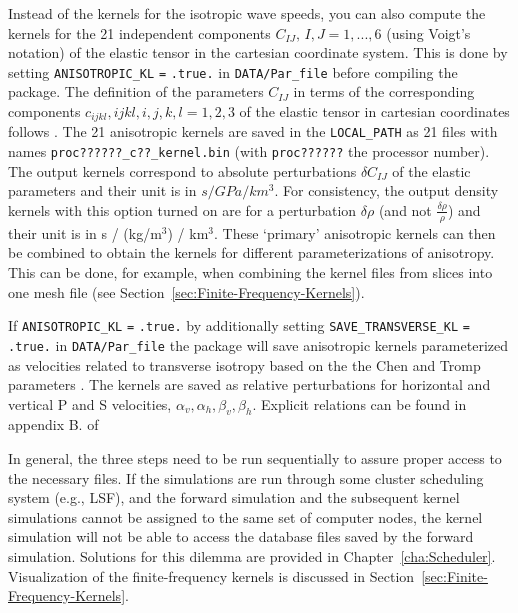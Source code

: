 \begin{enumerate}
Instead of the kernels for the isotropic wave speeds, you can also
compute the kernels for the 21 independent components $C_{IJ},\, I,J=1,...,6$
(using Voigt's notation) of the elastic tensor in the cartesian coordinate
system. This is done by setting \texttt{ANISOTROPIC\_KL} \texttt{=}
\texttt{.true.} in \texttt{DATA/Par\_file} before compiling the package.
The definition of the parameters $C_{IJ}$ in terms of the corresponding
components $c_{ijkl},ijkl,i,j,k,l=1,2,3$ of the elastic tensor in
cartesian coordinates follows \citet{ChTr07}. The 21 anisotropic
kernels are saved in the \texttt{LOCAL\_PATH} as 21 files with names 
\texttt{proc??????\_c??\_kernel.bin} (with \texttt{proc??????}
the processor number). The output kernels correspond to absolute perturbations
$\delta C_{IJ}$ of the elastic parameters and their unit is in $s/GPa/km^{3}$.
For consistency, the output density kernels with this option turned
on are for a perturbation $\delta\rho$ (and not $\frac{\delta\rho}{\rho}$)
and their unit is in s / (kg/m$^{3}$) / km$^{3}$. These `primary'
anisotropic kernels can then be combined to obtain the kernels for
different parameterizations of anisotropy. This can be done, for example,
when combining the kernel files from slices into one mesh file (see
Section~\ref{sec:Finite-Frequency-Kernels}).\newline


If \texttt{ANISOTROPIC\_KL} \texttt{=} \texttt{.true.} by additionally
setting \texttt{SAVE\_TRANSVERSE\_KL} \texttt{=} \texttt{.true.} in \texttt{DATA/Par\_file}
the package will save anisotropic kernels parameterized as velocities
related to transverse isotropy based on the the Chen and Tromp parameters
\citet{ChTr07}. The kernels are saved as relative perturbations for
horizontal and vertical P and S velocities, $\alpha_{v},\alpha_{h},\beta_{v},\beta_{h}$.
Explicit relations can be found in appendix B. of \citet{SiLiTrTr07b}\newline


\end{enumerate}

In general, the three steps need to be run sequentially to assure
proper access to the necessary files. If the simulations are run through
some cluster scheduling system (e.g., LSF), and the forward simulation
and the subsequent kernel simulations cannot be assigned to the same
set of computer nodes, the kernel simulation will not be able to access
the database files saved by the forward simulation. Solutions for
this dilemma are provided in Chapter~\ref{cha:Scheduler}. Visualization
of the finite-frequency kernels is discussed in Section~\ref{sec:Finite-Frequency-Kernels}.

